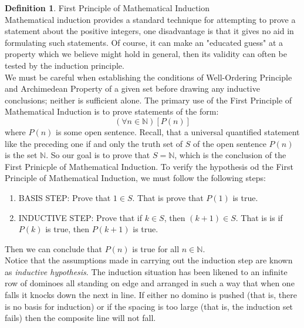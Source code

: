 \documentclass{book}
\theoremstyle{definition}
\newtheorem{definition}{Definition}[section]
\theoremstyle{remark}
\newcommand{\bb}[1]{\mathbb{#1}}
\begin{document}
\newpage
\begin{definition}
First Principle of Mathematical Induction \\

Mathematical induction provides a standard technique for attempting to prove a statement about the positive integers, one disadvantage is that it gives no aid in formulating such statements. Of course, it can make an "educated guess" at a property which we believe might hold in general, then its validity can often be tested by the induction principle. \\

We must be careful when establishing the conditions of Well-Ordering Principle and Archimedean Property of a given set before drawing any inductive conclusions; neither is sufficient alone. The primary use of the First Principle of Mathematical Induction is to prove statements of the form:
    \begin{equation*}
        (\forall n \in \bb{N})[P(n)]
    \end{equation*}
where $P(n)$ is some open sentence. Recall, that a universal quantified statement like the preceding one if and only the truth set of $S$ of the open sentence $P(n)$ is the set $\bb{N}$. So our goal is to prove that $S = \bb{N}$, which is the conclusion of the First Prinicple of Mathematical Induction. To verify the hypothesis od the First Principle of Mathematical Induction, we must follow the following steps:
    \begin{enumerate}
        \item BASIS STEP: Prove that  $1 \in S$. That is prove that $P(1)$ is true.
        \item INDUCTIVE STEP: Prove that if $k \in S$, then $(k+1) \in S$. That is is if $P(k)$ is true, then $P(k+1)$ is true.
    \end{enumerate}
Then we can conclude that $P(n)$ is true for all $n \in \bb{N}$. \\

Notice that the assumptions made in carrying out the induction step are known as \textit{inductive hypothesis}. The induction situation has been likened to an infinite row of dominoes all standing on edge and arranged in such a way that when one falls it knocks down the next in line. If either no domino is pushed (that is, there is no basis for induction) or if the spacing is too large (that is, the induction set fails) then the composite line will not fall. \\   


\end{definition}
\end{document}

